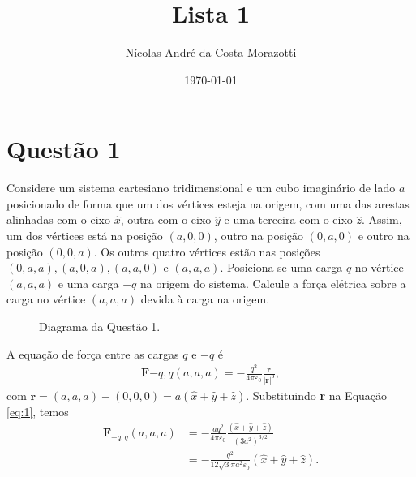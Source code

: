 \documentclass[11pt]{article}
\author{Nícolas André da Costa Morazotti}
\date{\today}
\title{Lista 1}
\begin{document}
\maketitle
\section{Questão 1}
\label{sec:orgf55cdbc}
Considere um sistema cartesiano tridimensional e um cubo imaginário de
lado \(a\) posicionado de forma que um dos vértices esteja na origem, com
uma das arestas alinhadas com o eixo \(\hat x\), outra com o eixo \(\hat y\)
e uma terceira com o eixo \(\hat z\). Assim, um dos vértices está na
posição \((a,0,0)\), outro na posição \((0,a,0)\) e outro na posição
\((0,0,a)\). Os outros quatro vértices estão nas posições
\((0,a,a), (a,0,a), (a,a,0)\) e \((a,a,a)\). Posiciona-se uma carga \(q\) no
vértice \((a,a,a)\) e uma carga \(-q\) na origem do sistema. Calcule a força
elétrica sobre a carga no vértice \((a,a,a)\) devida à carga na origem. 

\begin{figure}[h!]
  \centering
  \caption{Diagrama da Questão 1.}
  \label{fig:ex-1}
\end{figure}

A equação de força entre as cargas \(q\) e \(-q\) é
\begin{align}
  \label{eq:1}
  \mathbf{F}{-q,q}(a,a,a) = -\frac{q^2}{4\pi\varepsilon_0}\frac{\mathbf{r}}{|\mathbf{r}|^3},
\end{align}
com \(\mathbf r = (a,a,a) - (0,0,0) = a(\hat x+\hat y+\hat
z)\). Substituindo \textbf{r} na Equação \ref{eq:1}, temos
\begin{align*}
  \mathbf{F}_{-q,q}(a,a,a) &= -\frac{aq^2}{4\pi\varepsilon_0}
                             \frac{(\hat x+\hat y+\hat z)}{(3a^2)^{3/2}}\\
                           &= -\frac{q^2}{12\sqrt3\pi a^2\varepsilon_0}(\hat x+\hat y+\hat z).
\end{align*}
\end{document}
